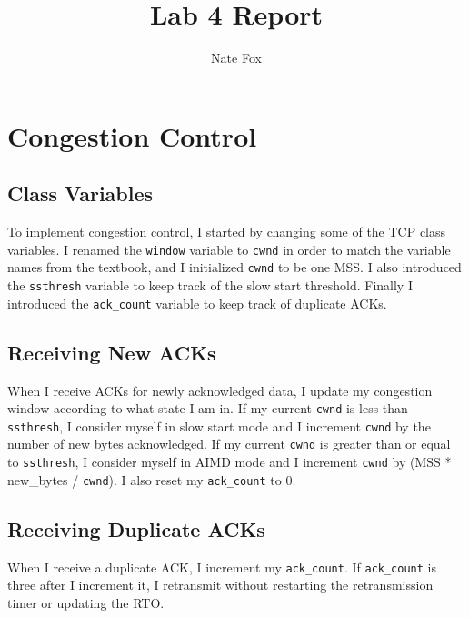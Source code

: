 \documentclass[11pt]{article}
\newcommand{\code}[1]{\texttt{#1}}
\begin{document}
\lstset{
  language=Python,
  basicstyle=\small,          %
  keywordstyle=\bfseries,
  identifierstyle=,           %
  commentstyle=,              %
  stringstyle=\ttfamily,      %
  showstringspaces=false,     %
  numbers=left,
  numberstyle=\tiny,
  numbersep=5pt,
  frame=tb,
}

\title{Lab 4 Report}

\author{Nate Fox}

\date{}

\maketitle

\section{Congestion Control}

\subsection{Class Variables}
To implement congestion control, I started by changing some of the TCP class variables. I renamed the \code{window} variable to \code{cwnd} in order to match the variable names from the textbook, and I initialized \code{cwnd} to be one MSS. I also introduced the \code{ssthresh} variable to keep track of the slow start threshold. Finally I introduced the \code{ack\_count} variable to keep track of duplicate ACKs.

\subsection{Receiving New ACKs}
When I receive ACKs for newly acknowledged data, I update my congestion window according to what state I am in. If my current \code{cwnd} is less than \code{ssthresh}, I consider myself in slow start mode and I increment \code{cwnd} by the number of new bytes acknowledged. If my current \code{cwnd} is greater than or equal to \code{ssthresh}, I consider myself in AIMD mode and I increment \code{cwnd} by (MSS * new\_bytes / \code{cwnd}). I also reset my \code{ack\_count} to 0.
 
\subsection{Receiving Duplicate ACKs}
When I receive a duplicate ACK, I increment my \code{ack\_count}. If \code{ack\_count} is three after I increment it, I retransmit without restarting the retransmission timer or updating the RTO.
\end{document}
